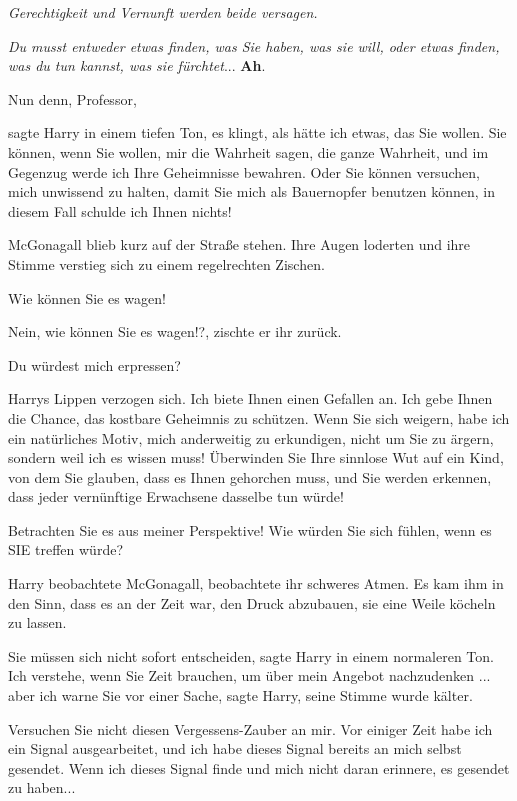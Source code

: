 \emph{Gerechtigkeit und Vernunft werden beide versagen. }

\emph{Du musst entweder etwas finden, was Sie haben, was sie will, oder etwas
finden, was du tun kannst, was sie fürchtet}... \textbf{Ah}.

\glqq Nun denn, Professor\grqq{},

sagte Harry in einem tiefen Ton, \glqq es klingt, als hätte ich etwas, das Sie
wollen. Sie können, wenn Sie wollen, mir die Wahrheit sagen, die ganze Wahrheit,
und im Gegenzug werde ich Ihre Geheimnisse bewahren. Oder Sie können versuchen,
mich unwissend zu halten, damit Sie mich als Bauernopfer benutzen können, in
diesem Fall schulde ich Ihnen nichts!\grqq{}

McGonagall blieb kurz auf der Straße stehen. Ihre Augen loderten und ihre Stimme
verstieg sich zu einem regelrechten Zischen.

\glqq Wie können Sie es wagen!\grqq{}

\glqq Nein, wie können Sie es wagen!?\grqq{}, zischte er ihr zurück.

\glqq Du würdest mich erpressen?\grqq{}

Harrys Lippen verzogen sich. \glqq Ich biete Ihnen einen Gefallen an. Ich gebe
Ihnen die Chance, das kostbare Geheimnis zu schützen. Wenn Sie sich weigern,
habe ich ein natürliches Motiv, mich anderweitig zu erkundigen, nicht um Sie zu
ärgern, sondern weil ich es wissen muss! Überwinden Sie Ihre sinnlose Wut auf
ein Kind, von dem Sie glauben, dass es Ihnen gehorchen muss, und Sie werden
erkennen, dass jeder vernünftige Erwachsene dasselbe tun würde!

Betrachten Sie es aus meiner Perspektive! Wie würden Sie sich fühlen, wenn es
SIE treffen würde?\grqq{}

Harry beobachtete McGonagall, beobachtete ihr schweres Atmen. Es kam ihm in den
Sinn, dass es an der Zeit war, den Druck abzubauen, sie eine Weile köcheln zu
lassen.

\glqq Sie müssen sich nicht sofort entscheiden\grqq{}, sagte Harry in einem
normaleren Ton. \glqq Ich verstehe, wenn Sie Zeit brauchen, um über mein Angebot
nachzudenken ... aber ich warne Sie vor einer Sache\grqq{}, sagte Harry, seine
Stimme wurde kälter.

\glqq Versuchen Sie nicht diesen Vergessens-Zauber an mir. Vor einiger Zeit habe
ich ein Signal ausgearbeitet, und ich habe dieses Signal bereits an mich selbst
gesendet. Wenn ich dieses Signal finde und mich nicht daran erinnere, es
gesendet zu haben...\grqq{}

